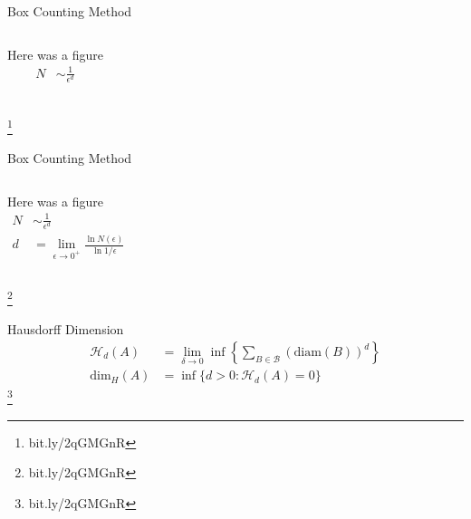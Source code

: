 \documentclass[10pt]{beamer}
\newcommand\blfootnote[1]{%
  \begingroup
  \renewcommand\thefootnote{}\footnote{#1}%
  \addtocounter{footnote}{-1}%
  \endgroup
}
\begin{document}
\begin{frame}{Box Counting Method}
    \begin{columns}[c]
        \column{1.5in}
                Here was a figure
        \column{1.5in}
            \begin{align*}
                N &\sim \frac{1}{\epsilon^d} \\
            \end{align*}
    \end{columns}
    \blfootnote{bit.ly/2qGMGnR}
\end{frame}

\begin{frame}{Box Counting Method}
    \begin{columns}[c]
        \column{1.5in}
                Here was a figure
        \column{1.5in}
            \begin{align*}
                N &\sim \frac{1}{\epsilon^d} \\
                d &= \lim_{\epsilon \to 0^+} \frac{\ln N(\epsilon)}{\ln 1 / \epsilon}
            \end{align*}
    \end{columns}
    \blfootnote{bit.ly/2qGMGnR}
\end{frame}


\begin{frame}{Hausdorff Dimension}
    \begin{align*}
        \mathcal{H}_d (A) &= \lim_{\delta \to 0} \inf \left \{ \sum_{B \in \mathcal{B}} \left ( \text{diam}(B) \right)^d \right \} \\
        \text{dim}_H (A) &= \inf \{ d > 0 : \mathcal{H}_d (A) = 0 \}
    \end{align*}
    \blfootnote{bit.ly/2qGMGnR}
\end{frame}
\end{document}
